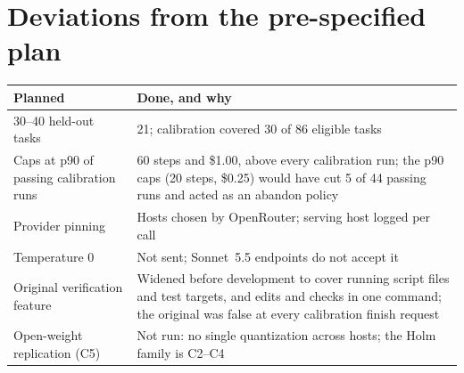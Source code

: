 \documentclass[10pt]{article}
\begin{document}
\begin{center}\small
\setlength{\tabcolsep}{4pt}

\end{center}

\section{Deviations from the pre-specified plan}
\label{app:deviations}

\begin{center}\small
\begin{tabularx}{\linewidth}{@{}lX@{}}
  \toprule
  Planned & Done, and why \\
  \midrule
  30--40 held-out tasks & 21; calibration covered 30 of 86 eligible tasks \\
  Caps at p90 of passing calibration runs & 60 steps and \$1.00, above every calibration run; the p90 caps (20 steps, \$0.25) would have cut 5 of 44 passing runs and acted as an abandon policy \\
  Provider pinning & Hosts chosen by OpenRouter; serving host logged per call \\
  Temperature 0 & Not sent; Sonnet~5.5 endpoints do not accept it \\
  Original verification feature & Widened before development to cover running script files and test targets, and edits and checks in one command; the original was false at every calibration finish request \\
  Open-weight replication (C5) & Not run: no single quantization across hosts; the Holm family is C2--C4 \\
  \bottomrule
\end{tabularx}
\end{center}
\end{document}
